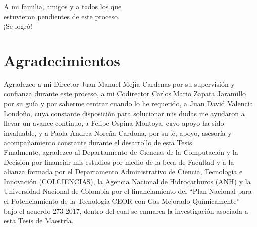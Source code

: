 \newpage{\pagestyle{empty}\cleardoublepage}

\newpage
\thispagestyle{empty} \textbf{}\normalsize
\\\\\\%
~\\[4.0cm]

\begin{flushright}
\begin{minipage}{8cm}
    \noindent
        \small
        ~\\[2.0cm]
        A mi familia, amigos y a todos los que\\
        estuvieron pendientes de este proceso.\\
        ¡Se logró!
        
\end{minipage}
\end{flushright}

\chapter*{Agradecimientos}
Agradezco a mi Director Juan Manuel Mejía Cardenas por su supervisión y confianza durante este proceso, a mi Codirector Carlos Mario Zapata Jaramillo por su guía y por saberme centrar cuando lo he requerido, a Juan David Valencia Londoño, cuya constante disposición para solucionar mis dudas me ayudaron a llevar un avance continuo, a Felipe Ospina Montoya, cuyo apoyo ha sido invaluable, y a Paola Andrea Nore\~{n}a Cardona, por su fé, apoyo, asesoría y acompañamiento constante durante el desarrollo de esta Tesis.\\

Finalmente, agradezco al Departamiento de Ciencias de la Computación y la Decisión por financiar mis estudios por medio de la beca de Facultad y a la alianza formada por el Departamento Administrativo de Ciencia, Tecnología e Innovación (COLCIENCIAS), la Agencia Nacional de Hidrocarburos (ANH) y la Universidad Nacional de Colombia por el financiamiento del ``Plan Nacional para el Potenciamiento de la Tecnología CEOR con Gas Mejorado Químicamente'' bajo el acuerdo 273-2017, dentro del cual se enmarca la investigación asociada a esta Tesis de Maestría.

